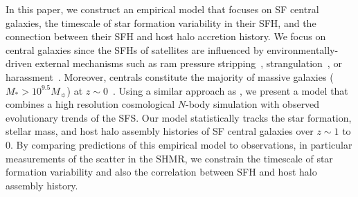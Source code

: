 \documentclass[12pt, letterpaper, preprint, tighten]{aastex62}
\begin{document}
In this paper, we construct an empirical model that focuses on SF 
central galaxies, the timescale of star formation variability in their 
SFH, and the connection between their SFH and host halo accretion history. 
We focus on central galaxies since the SFHs of satellites are influenced 
by environmentally-driven external mechanisms such as ram pressure 
stripping~\citep{gunn1972,bekki2009}, strangulation~\citep{larson1980, peng2015}, 
or harassment~\citep{moore1998}. Moreover, centrals constitute the majority 
of massive galaxies ($M_*>10^{9.5}M_\sun$) at $z\sim0$~\citep{wetzel2013}. 
Using a similar approach as \cite{wetzel2013, hahn2017b}, we present a model 
that combines a high resolution cosmological $N$-body simulation with 
observed evolutionary trends of the SFS. Our model statistically tracks 
the star formation, stellar mass, and host halo assembly histories of SF 
central galaxies over $z\sim1$ to $0$. By comparing predictions of this empirical 
model to observations, in particular measurements of the scatter in the 
SHMR, we constrain the timescale of star formation variability and also 
the correlation between SFH and host halo assembly history.  
\end{document}
